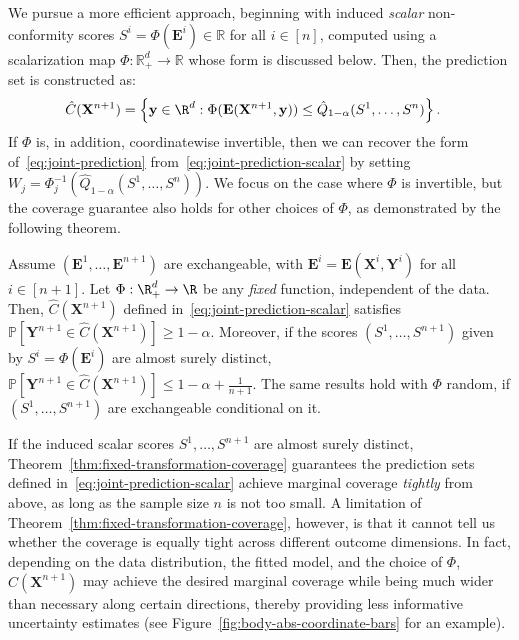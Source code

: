 {\color{blue}We pursue a more efficient approach, beginning with induced {\em scalar} non-conformity scores $S^i = \Phi(\mathbf{E}^i) \in \mathbb{R}$ for all $i \in [n]$, computed using a scalarization map $\Phi : \mathbb{R}^d_+ \to \mathbb{R}$ whose form is discussed below.
Then, the prediction set is constructed as:
\begin{equation}
    \begin{aligned}
        \hat{C}(\mathbf{X}^{n+1}) &= \left\{\mathbf y \in \R^d: \Phi(\mathbf E(\mathbf{X}^{n+1},\mathbf y)) \leq \hat{Q}_{1-\alpha}(S^1,\ldots,S^n) \right\}.
    \end{aligned}
    \label{eq:joint-prediction-scalar}
\end{equation}
If $\Phi$ is, in addition, coordinatewise invertible, then we can recover the form of~\eqref{eq:joint-prediction} from~\eqref{eq:joint-prediction-scalar} by setting $W_j = \Phi^{-1}_j\left(\hat{Q}_{1-\alpha}(S^1,\ldots,S^n)\right)$. We focus on the case where $\Phi$ is invertible, but the coverage guarantee also holds for other choices of $\Phi$, as demonstrated by the following theorem.

\begin{theorem} \label{thm:fixed-transformation-coverage}
Assume $(\mathbf{E}^1,\ldots,\mathbf{E}^{n+1})$ are exchangeable, with $\mathbf{E}^i = \mathbf E(\mathbf X^i, \mathbf Y^i)$ for all $i \in [n+1]$.
Let $\Phi:\R^d_+ \to \R$ be any \emph{fixed} function, independent of the data.
Then, $\hat{C}(\mathbf{X}^{n+1})$ defined in~\eqref{eq:joint-prediction-scalar} satisfies $\mathbb{P}[ \mathbf{Y}^{n+1} \in \hat{C}(\mathbf{X}^{n+1}) ] \ge 1 - \alpha$.
Moreover, if the scores $(S^1,\ldots,S^{n+1})$ given by $S^i = \Phi(\mathbf{E}^i)$ are almost surely distinct, $\mathbb{P}[ \mathbf{Y}^{n+1} \in \hat{C}(\mathbf{X}^{n+1}) ] \leq 1 - \alpha + \frac{1}{n+1}$.
The same results hold with $\Phi$ random, if $(S^1,\ldots,S^{n+1})$ are exchangeable conditional on it.
\end{theorem}

If the induced scalar scores $S^1,\ldots,S^{n+1}$ are almost surely
distinct, Theorem~\ref{thm:fixed-transformation-coverage} guarantees the prediction sets defined in~\eqref{eq:joint-prediction-scalar} achieve marginal coverage {\em tightly} from above, as long as the sample size $n$ is not too small.
A limitation of Theorem~\ref{thm:fixed-transformation-coverage}, however, is that it cannot tell us whether the coverage is equally tight across different outcome dimensions.
In fact, depending on the data distribution, the fitted model, and the choice of $\Phi$, $\hat{C}(\mathbf{X}^{n+1})$ may achieve the desired marginal coverage while being much wider than necessary along certain directions, thereby providing less informative uncertainty estimates (see Figure~\ref{fig:body-abs-coordinate-bars} for an example).
}

